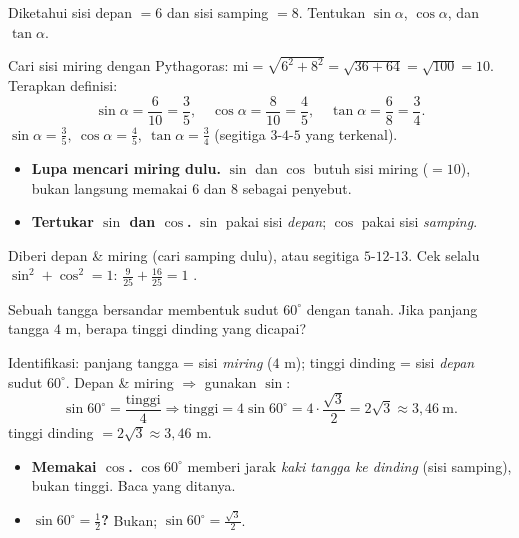 \begin{soalbox}{}
Diketahui sisi depan $=6$ dan sisi samping $=8$. Tentukan $\sin\alpha$,
$\cos\alpha$, dan $\tan\alpha$.
\end{soalbox}

\jawab
{} Cari sisi miring dengan Pythagoras:
$\text{mi}=\sqrt{6^2+8^2}=\sqrt{36+64}=\sqrt{100}=10$.
 Terapkan definisi:
\[
\sin\alpha=\frac{6}{10}=\frac35,\quad
\cos\alpha=\frac{8}{10}=\frac45,\quad
\tan\alpha=\frac{6}{8}=\frac34.
\]
\jadi $\sin\alpha=\frac35,\ \cos\alpha=\frac45,\ \tan\alpha=\frac34$
(segitiga $3$-$4$-$5$ yang terkenal).

\begin{jebakan}
\begin{itemize}[leftmargin=*,topsep=2pt]
  \item \textbf{Lupa mencari miring dulu.} $\sin$ dan $\cos$ butuh sisi miring
  ($=10$), bukan langsung memakai $6$ dan $8$ sebagai penyebut.
  \item \textbf{Tertukar $\sin$ dan $\cos$.} $\sin$ pakai sisi \emph{depan};
  $\cos$ pakai sisi \emph{samping}.
\end{itemize}
\end{jebakan}

\begin{variasi}
Diberi depan \& miring (cari samping dulu), atau segitiga $5$-$12$-$13$. Cek
selalu $\sin^2+\cos^2=1$: $\frac{9}{25}+\frac{16}{25}=1$ \checkmark.
\end{variasi}

\begin{soalbox}{}
Sebuah tangga bersandar membentuk sudut $60^\circ$ dengan tanah. Jika panjang
tangga $4$ m, berapa tinggi dinding yang dicapai?
\end{soalbox}

\jawab
{} Identifikasi: panjang tangga = sisi \emph{miring} ($4$ m); tinggi
dinding = sisi \emph{depan} sudut $60^\circ$.
 Depan \& miring $\Rightarrow$ gunakan $\sin$:
\[
\sin60^\circ=\frac{\text{tinggi}}{4}\Rightarrow \text{tinggi}=4\sin60^\circ
=4\cdot\frac{\sqrt3}{2}=2\sqrt3\approx3{,}46\ \text{m}.
\]
\jadi tinggi dinding $=2\sqrt3\approx3{,}46$ m.

\begin{jebakan}
\begin{itemize}[leftmargin=*,topsep=2pt]
  \item \textbf{Memakai $\cos$.} $\cos60^\circ$ memberi jarak \emph{kaki tangga
  ke dinding} (sisi samping), bukan tinggi. Baca yang ditanya.
  \item \textbf{$\sin60^\circ=\frac12$?} Bukan; $\sin60^\circ=\frac{\sqrt3}{2}$.
\end{itemize}
\end{jebakan}


